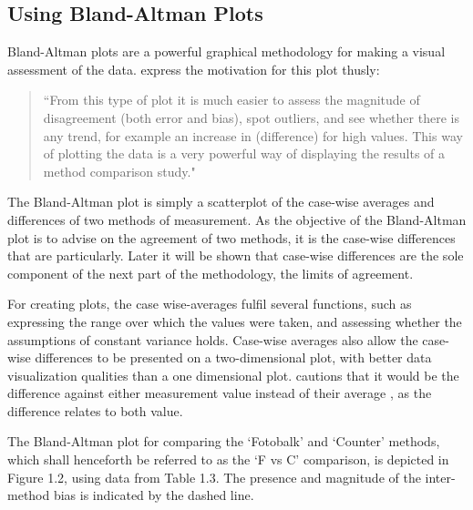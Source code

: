\documentclass[Main.tex]{subfiles}
\begin{document}
	
	
	
	\subsection{Using Bland-Altman Plots}
	Bland-Altman plots are a powerful graphical methodology for making
	a visual assessment of the data. \citet*{BA83} express the
	motivation for this plot thusly:
	\begin{quote}
		``From this type of plot it is much easier to assess the magnitude
		of disagreement (both error and bias), spot outliers, and see
		whether there is any trend, for example an increase in
		(difference) for high values. This way of plotting the data is a
		very powerful way of displaying the results of a method comparison
		study."
	\end{quote}
	
	The Bland-Altman plot is simply a scatterplot of the case-wise
	averages and differences of two methods of measurement. As the
	objective of the Bland-Altman plot is to advise on the agreement
	of two methods, it is the case-wise differences that are
	particularly. Later it will be shown that case-wise differences
	are the sole component of the next part of the methodology, the
	limits of agreement.
	
	For creating plots, the case wise-averages fulfil several
	functions, such as expressing the range over which the values were
	taken, and assessing whether the assumptions of constant variance
	holds. Case-wise averages also allow the case-wise differences to
	be presented on a two-dimensional plot, with better data
	visualization qualities than a one dimensional plot. \citet{BA86}
	cautions that it would be the difference against either
	measurement value instead of their average , as the difference
	relates to both value.
	
	The Bland-Altman plot for comparing the `Fotobalk' and `Counter'
	methods, which shall henceforth be referred to as the `F vs C'
	comparison,  is depicted in Figure 1.2, using data from Table 1.3.
	The presence and magnitude of the inter-method bias is indicated
	by the dashed line.
	
\end{document}

